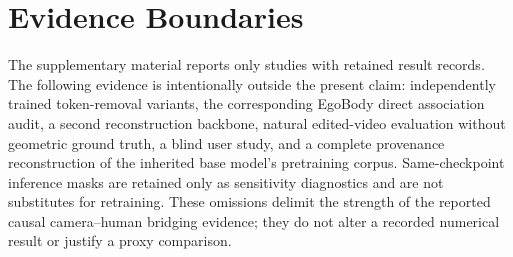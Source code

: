 \section{Evidence Boundaries}

The supplementary material reports only studies with retained result records.
The following evidence is intentionally outside the present claim:
independently trained token-removal variants, the corresponding EgoBody direct
association audit, a second reconstruction backbone, natural edited-video
evaluation without geometric ground truth, a blind user study, and a complete
provenance reconstruction of the inherited \humanthree{} base model's
pretraining corpus. Same-checkpoint inference masks are retained only as
sensitivity diagnostics and are not substitutes for retraining.
These omissions delimit the strength of the reported causal camera--human
bridging evidence; they do not alter a recorded numerical result or justify a
proxy comparison.
